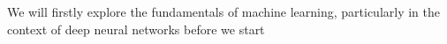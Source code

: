 We will firstly explore the fundamentals of machine learning, particularly in the context of deep neural networks before we start